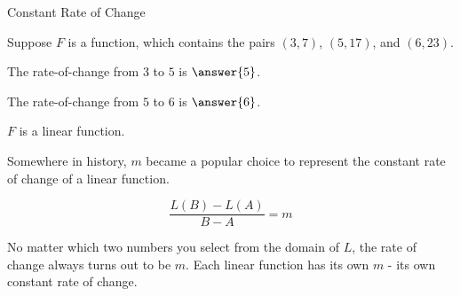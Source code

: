 \documentclass{ximera}
\begin{document}
\begin{example} Constant Rate of Change


Suppose $F$ is a function, which contains the pairs $(3, 7)$, $(5, 17)$, and $(6, 23)$.


The rate-of-change from $3$ to $5$ is $\answer{5}$.

The rate-of-change from $5$ to $6$ is $\answer{6}$.

\begin{question} 
$F$ is a linear function.
\begin{multipleChoice}
\end{multipleChoice}
\end{question}

\end{example}


Somewhere in history, $m$ became a popular choice to represent the constant rate of change of a linear function.



\[
\frac{L(B) - L(A)}{B - A} = m
\]





No matter which two numbers you select from the domain of $L$, the rate of change always turns out to be $m$.  Each linear function has its own $m$ - its own constant rate of change.
\end{document}
